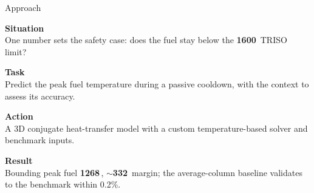 \documentclass[aspectratio=169, 11pt, t]{beamer}
\newcommand{\key}[1]{\textbf{#1}}
\newcommand{\hot}[1]{\textcolor{RadHot}{\textbf{#1}}}
\begin{document}
\begin{frame}{Approach}
\vfill
\begin{tcbraster}[raster columns=2, raster equal height=all,
    raster column skip=6mm, raster row skip=5mm]
  \begin{tcolorbox}[bluebox]
  {\color{RadBlue}\bfseries Situation}\\[2pt]
  \footnotesize One number sets the safety case: does the fuel stay below the \hot{1600\,\textcelsius} TRISO limit?
  \end{tcolorbox}
  \begin{tcolorbox}[tealbox]
  {\color{RadTeal}\bfseries Task}\\[2pt]
  \footnotesize Predict the peak fuel temperature during a passive cooldown, with the context to assess its accuracy.
  \end{tcolorbox}
  \begin{tcolorbox}[amberbox]
  {\color{RadAmberD}\bfseries Action}\\[2pt]
  \footnotesize A 3D conjugate heat-transfer model with a custom temperature-based solver and benchmark inputs.
  \end{tcolorbox}
  \begin{tcolorbox}[hotbox]
  {\color{RadHot}\bfseries Result}\\[2pt]
  \footnotesize Bounding peak fuel \hot{1268\,\textcelsius}, \key{$\sim$332\,\textcelsius} margin; the average-column baseline validates to the benchmark within 0.2\%.
  \end{tcolorbox}
\end{tcbraster}
\vfill
\end{frame}
\end{document}
